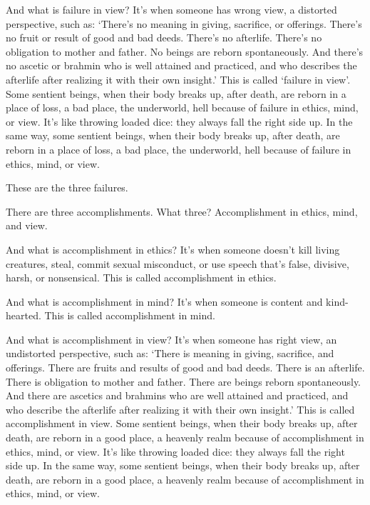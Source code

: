 \documentclass[12pt,openany]{book}%
\begin{document}
And what is failure in view? It’s when someone has wrong view, a distorted perspective, such as: ‘There’s no meaning in giving, sacrifice, or offerings. There’s no fruit or result of good and bad deeds. There’s no afterlife. There’s no obligation to mother and father. No beings are reborn spontaneously. And there’s no ascetic or brahmin who is well attained and practiced, and who describes the afterlife after realizing it with their own insight.’ This is called ‘failure in view’. Some sentient beings, when their body breaks up, after death, are reborn in a place of loss, a bad place, the underworld, hell because of failure in ethics, mind, or view. It’s like throwing loaded dice: they always fall the right side up. In the same way, some sentient beings, when their body breaks up, after death, are reborn in a place of loss, a bad place, the underworld, hell because of failure in ethics, mind, or view. 

These are the three failures. 

There are three accomplishments. What three? Accomplishment in ethics, mind, and view. 

And what is accomplishment in ethics? It’s when someone doesn’t kill living creatures, steal, commit sexual misconduct, or use speech that’s false, divisive, harsh, or nonsensical. This is called accomplishment in ethics. 

And what is accomplishment in mind? It’s when someone is content and kind-hearted. This is called accomplishment in mind. 

And what is accomplishment in view? It’s when someone has right view, an undistorted perspective, such as: ‘There is meaning in giving, sacrifice, and offerings. There are fruits and results of good and bad deeds. There is an afterlife. There is obligation to mother and father. There are beings reborn spontaneously. And there are ascetics and brahmins who are well attained and practiced, and who describe the afterlife after realizing it with their own insight.’ This is called accomplishment in view. Some sentient beings, when their body breaks up, after death, are reborn in a good place, a heavenly realm because of accomplishment in ethics, mind, or view. It’s like throwing loaded dice: they always fall the right side up. In the same way, some sentient beings, when their body breaks up, after death, are reborn in a good place, a heavenly realm because of accomplishment in ethics, mind, or view. 
\end{document}
